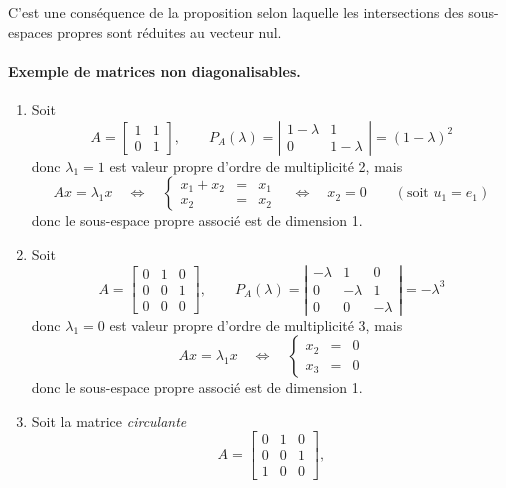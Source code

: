 \proof
C'est une conséquence de la proposition selon laquelle les intersections des sous-espaces propres sont réduites au vecteur nul.
\eproof

\paragraph*{Exemple de matrices non diagonalisables.}
\begin{enumerate}
 \item Soit
 $$
 A = \left[\begin{array}{cc} 1 & 1 \\ 0 & 1 \end{array}\right],
 \qquad 
 P_A(\lambda) 
 = \left|\begin{array}{cc} 1-\lambda & 1 \\ 0 & 1-\lambda \end{array}\right|
 = (1 - \lambda)^2
 $$
 donc $\lambda_1 = 1$ est valeur propre d'ordre de multiplicité 2, mais
 $$
 Ax = \lambda_1 x \quad \Leftrightarrow \quad 
 \left\{\begin{array}{rcl} x_1 + x_2 & = & x_1 \\ x_2 & = & x_2 \end{array} \right. \quad \Leftrightarrow \quad 
 x_2 = 0
 \qquad (\text{soit } u_1 = e_1)
 $$
 donc le sous-espace propre associé est de dimension 1.
 \item Soit 
 $$
 A = \left[\begin{array}{rrr} 0 & 1 & 0 \\ 0 & 0 & 1 \\ 0 & 0 & 0 \end{array}\right],
 \qquad 
 P_A(\lambda) 
 = \left|\begin{array}{rrr} -\lambda & 1 & 0 \\ 0 & -\lambda & 1 \\ 0 & 0 & -\lambda \end{array}\right|
 = -\lambda^3
 $$
 donc $\lambda_1 = 0$ est valeur propre d'ordre de multiplicité 3, mais
 $$
 A x = \lambda_1 x \quad \Leftrightarrow \quad 
 \left\{\begin{array}{rcl} x_2 & = & 0 \\ x_3 & = & 0 \end{array} \right.
 $$
 donc le sous-espace propre associé est de dimension 1.
 \item Soit la matrice {\em circulante}
 $$
 A = \left[\begin{array}{rrr} 0 & 1 & 0 \\ 0 & 0 & 1 \\ 1 & 0 & 0 \end{array}\right],
$$
\end{enumerate}
